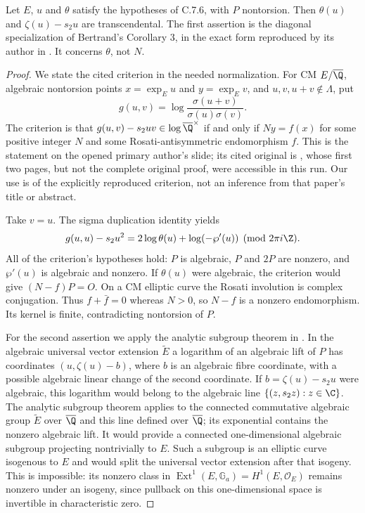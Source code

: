 \begin{statement}
Let $E$, $u$ and $\theta$ satisfy the hypotheses of C.7.6, with
$P$ nontorsion. Then $\theta(u)$ and
$\zeta(u)-s_2u$ are transcendental. The first assertion is the
diagonal specialization of Bertrand's Corollary 3, in the exact
form reproduced by its author in
\citet[final slide, comment (c)]{bertrand2017}. It concerns
$\theta$, not $N$.
\end{statement}
\begin{proof}
We state the cited criterion in the needed normalization. For CM
$E/\overline{\Q}$, algebraic nontorsion points $x=\exp_Eu$
and $y=\exp_Ev$, and $u,v,u+v\notin\Lambda$, put
\[
 g(u,v)=\log\frac{\sigma(u+v)}{\sigma(u)\sigma(v)}.
\]
The criterion is that
$g(u,v)-s_2uv\in\log\overline{\Q}^{\times}$ if and only if
$Ny=f(x)$ for some positive integer $N$ and some
Rosati-antisymmetric endomorphism $f$. This is the statement
on the opened primary author's slide; its cited original is
\citet[Corollary 3]{bertrand1984}, whose first two pages, but
not the complete original proof, were accessible in this run.
Our use is of the explicitly reproduced criterion, not an
inference from that paper's title or abstract.

Take $v=u$. The sigma duplication identity yields
\[
 g(u,u)-s_2u^2=2\log\theta(u)+\log(-\wp'(u))
                     \pmod{2\pi i\Z}.
\]
All of the criterion's hypotheses hold: $P$ is algebraic,
$P$ and $2P$ are nonzero, and $\wp'(u)$ is algebraic and
nonzero. If $\theta(u)$ were algebraic, the criterion would
give $(N-f)P=O$. On a CM elliptic curve the Rosati involution
is complex conjugation. Thus $f+\bar f=0$ whereas $N>0$,
so $N-f$ is a nonzero endomorphism. Its kernel is finite,
contradicting nontorsion of $P$.

For the second assertion we apply the analytic subgroup theorem
in \citet[Theorem 6.1]{huber2022}. In the algebraic universal
vector extension $\widetilde E$ a logarithm of an algebraic
lift of $P$ has coordinates $(u,\zeta(u)-b)$, where $b$ is
an algebraic fibre coordinate, with a possible algebraic linear
change of the second coordinate. If
$b=\zeta(u)-s_2u$ were algebraic, this logarithm would belong
to the algebraic line $\{(z,s_2z):z\in\C\}$.
The analytic subgroup theorem applies to the connected
commutative algebraic group $\widetilde E$ over
$\overline{\Q}$ and this line defined over
$\overline{\Q}$; its exponential contains the nonzero
algebraic lift. It would provide a connected one-dimensional
algebraic subgroup projecting nontrivially to $E$. Such a
subgroup is an elliptic curve isogenous to $E$ and would
split the universal vector extension after that isogeny.
This is impossible: its nonzero class in
$\operatorname{Ext}^1(E,\mathbb G_a)=H^1(E,\mathcal O_E)$
remains nonzero under an isogeny, since pullback on this
one-dimensional space is invertible in characteristic zero.
\end{proof}

